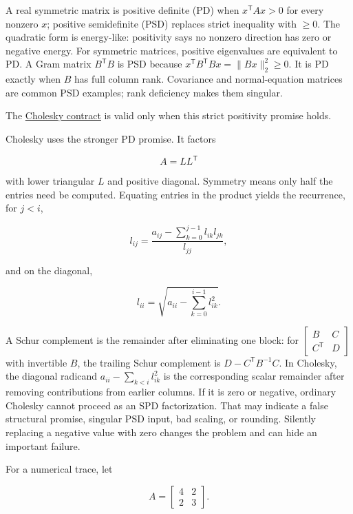 \hypertarget{01-foundations-i-ch020-positive-definiteness-is-a-structural-promise}{}

A real symmetric matrix is positive definite (PD) when \(x^\mathsf T A x>0\) for every nonzero \(x\); positive semidefinite (PSD) replaces strict inequality with \(\ge0\). The quadratic form is energy-like: positivity says no nonzero direction has zero or negative energy. For symmetric matrices, positive eigenvalues are equivalent to PD. A Gram matrix \(B^\mathsf T B\) is PSD because \(x^\mathsf T B^\mathsf T Bx=\|Bx\|_2^2\ge0\). It is PD exactly when \(B\) has full column rank. Covariance and normal-equation matrices are common PSD examples; rank deficiency makes them singular.

The \hyperref[01-foundations-i-ch020-positive-definiteness-is-a-structural-promise]{Cholesky contract} is valid only when this strict positivity promise holds.

Cholesky uses the stronger PD promise. It factors

\[
A=LL^\mathsf T
\]

with lower triangular \(L\) and positive diagonal. Symmetry means only half the entries need be computed. Equating entries in the product yields the recurrence, for \(j<i\),

\[
l_{ij}=\frac{a_{ij}-\sum_{k=0}^{j-1}l_{ik}l_{jk}}{l_{jj}},
\]

and on the diagonal,

\[
l_{ii}=\sqrt{a_{ii}-\sum_{k=0}^{i-1}l_{ik}^2}.
\]

A Schur complement is the remainder after eliminating one block: for \(\begin{bmatrix}B&C\\C^\mathsf T&D\end{bmatrix}\) with invertible \(B\), the trailing Schur complement is \(D-C^\mathsf TB^{-1}C\). In Cholesky, the diagonal radicand \(a_{ii}-\sum_{k<i}l_{ik}^2\) is the corresponding scalar remainder after removing contributions from earlier columns. If it is zero or negative, ordinary Cholesky cannot proceed as an SPD factorization. That may indicate a false structural promise, singular PSD input, bad scaling, or rounding. Silently replacing a negative value with zero changes the problem and can hide an important failure.

For a numerical trace, let

\[
A=\begin{bmatrix}4&2\\2&3\end{bmatrix}.
\]

